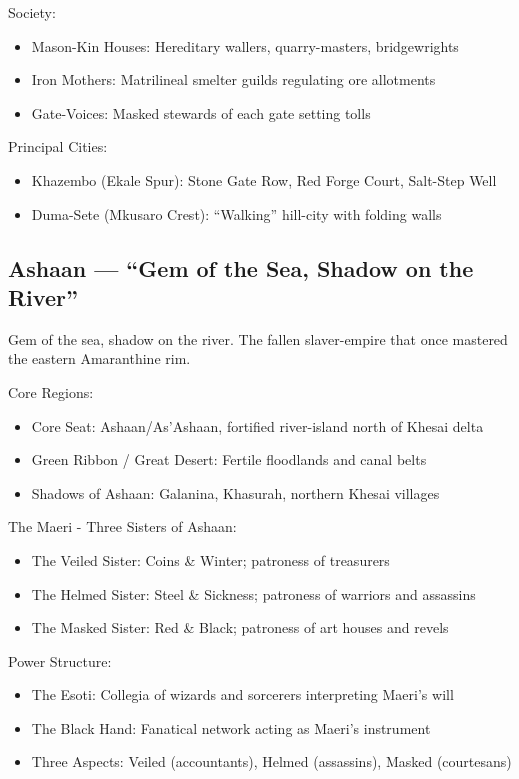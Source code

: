 Society:
\begin{itemize}
    \item Mason-Kin Houses: Hereditary wallers, quarry-masters, bridgewrights
    \item Iron Mothers: Matrilineal smelter guilds regulating ore allotments
    \item Gate-Voices: Masked stewards of each gate setting tolls
\end{itemize}

Principal Cities:
\begin{itemize}
    \item Khazembo (Ekale Spur): Stone Gate Row, Red Forge Court, Salt-Step Well
    \item Duma-Sete (Mkusaro Crest): ``Walking'' hill-city with folding walls
\end{itemize}

\subsection{Ashaan --- ``Gem of the Sea, Shadow on the River''}
\label{sec:ashaan}

Gem of the sea, shadow on the river. The fallen slaver-empire that once mastered the eastern Amaranthine rim.

Core Regions:
\begin{itemize}
    \item Core Seat: Ashaan/As'Ashaan, fortified river-island north of Khesai delta
    \item Green Ribbon / Great Desert: Fertile floodlands and canal belts
    \item Shadows of Ashaan: Galanina, Khasurah, northern Khesai villages
\end{itemize}

The Maeri - Three Sisters of Ashaan:
\begin{itemize}
    \item The Veiled Sister: Coins \& Winter; patroness of treasurers
    \item The Helmed Sister: Steel \& Sickness; patroness of warriors and assassins
    \item The Masked Sister: Red \& Black; patroness of art houses and revels
\end{itemize}

Power Structure:
\begin{itemize}
    \item The Esoti: Collegia of wizards and sorcerers interpreting Maeri's will
    \item The Black Hand: Fanatical network acting as Maeri's instrument
    \item Three Aspects: Veiled (accountants), Helmed (assassins), Masked (courtesans)
\end{itemize}

